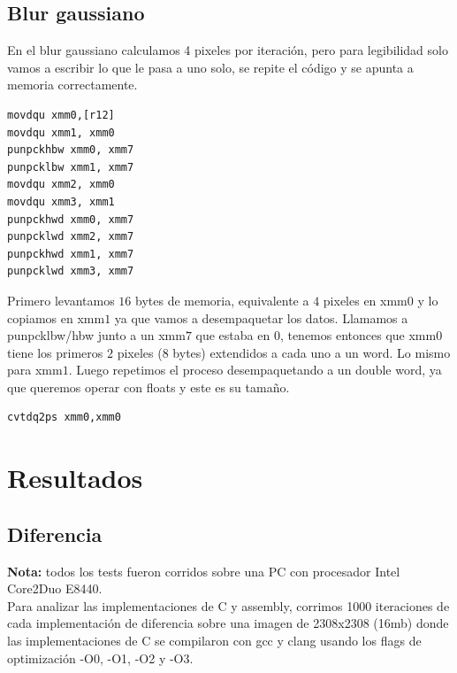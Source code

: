 \documentclass[a4paper]{article}
\begin{document}
\subsection{Blur gaussiano}

\noindent En el blur gaussiano calculamos 4 pixeles por iteración, pero para legibilidad solo vamos a escribir lo que le pasa a uno solo, se repite el código y se apunta a memoria correctamente. 

\begin{codesnippet}
\begin{verbatim}
movdqu xmm0,[r12]  
movdqu xmm1, xmm0
punpckhbw xmm0, xmm7 
punpcklbw xmm1, xmm7  
movdqu xmm2, xmm0
movdqu xmm3, xmm1
punpckhwd xmm0, xmm7  	
punpcklwd xmm2, xmm7   
punpckhwd xmm1, xmm7  
punpcklwd xmm3, xmm7  
\end{verbatim}
\end{codesnippet}

\noindent Primero levantamos $16$ bytes de memoria, equivalente a $4$ pixeles en xmm$0$ y lo copiamos en xmm$1$ ya que vamos a desempaquetar los datos. Llamamos a punpcklbw/hbw junto a un xmm$7$ que estaba en $0$, tenemos entonces que xmm$0$ tiene los primeros $2$ pixeles ($8$ bytes) extendidos a cada uno a un word. Lo mismo para xmm$1$. Luego repetimos el proceso desempaquetando a un double word, ya que queremos operar con floats y este es su tamaño. 

\begin{codesnippet}
\begin{verbatim}
cvtdq2ps xmm0,xmm0
\end{verbatim}
\end{codesnippet}



\newpage



\section{Resultados}

\subsection{Diferencia}

\noindent \textbf{Nota:} todos los tests fueron corridos sobre una PC con procesador Intel Core2Duo E8440.
\\
\noindent Para analizar las implementaciones de C y assembly, corrimos 1000 iteraciones de cada implementación de diferencia sobre una imagen de 2308x2308 (16mb) donde las implementaciones de C se compilaron con gcc y clang usando los flags de optimización -O0, -O1, -O2 y -O3.
\end{document}
